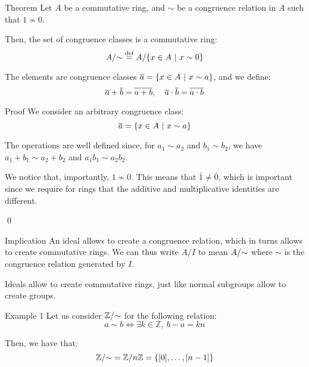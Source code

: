 \documentclass[a4paper]{article}
\begin{document}
\begin{parag}{Theorem}
    Let $A$ be a commutative ring, and $\sim$ be a congruence relation in $A$ such that $1 \not\sim 0$.

    Then, the set of congruence classes is a commutative ring: 
    \[\congclasses{A} \over{=}{def} A / \left\{x \in A \suchthat x \sim 0\right\}\]

    The elements are congruence classes $\bar{a} = \left\{x \in A \suchthat x \sim a\right\}$, and we define: 
    \[\overline{a} + \overline{b} = \overline{a + b}, \quad \overline{a}\cdot \overline{b} = \overline{a\cdot b}\]

    \begin{subparag}{Proof}
        We consider an arbitrary congruence class: 
        \[\bar{a} = \left\{x \in A \suchthat x \sim a\right\}\]
        
        The operations are well defined since, for $a_1 \sim a_2$ and $b_1 \sim b_2$, we have $a_1 + b_1 \sim a_2 + b_2$ and $a_1 b_1 \sim a_2 b_2$.

        We notice that, importantly, $1 \not\sim 0$. This means that $\bar{1} \neq \bar{0}$, which is important since we require for rings that the additive and multiplicative identities are different.

        \qed
    \end{subparag}

    \begin{subparag}{Implication}
        An ideal allows to create a congruence relation, which in turns allows to create commutative rings. We can thus write $A / I$ to mean $A/\text{$\sim$}$ where $\sim$ is the congruence relation generated by $I$.

        Ideals allow to create commutative rings, just like normal subgroups allow to create groups.
    \end{subparag}
\end{parag}

\begin{parag}{Example 1}
    Let us consider $\mathbb{Z}/\text{$\sim$}$ for the following relation:
    \[a \sim b \iff \exists k \in \mathbb{Z},\ b-a = kn\]

    Then, we have that: 
    \[\congclasses{\mathbb{Z}} = \mathbb{Z}/n\mathbb{Z} = \left\{\left[0\right], \ldots, \left[n-1\right]\right\}\]
\end{parag}
\end{document}
